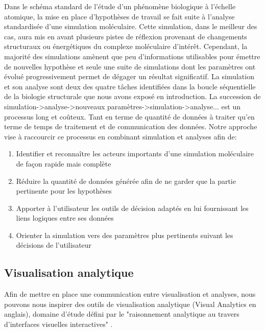 Dans le schéma standard de l'étude d'un phénomène biologique à l'échelle atomique, la mise en place d'hypothèses de travail se fait suite à l'analyse standardisée d'une simulation moléculaire. Cette simulation, dans le meilleur des cas, aura mis en avant plusieurs pistes de réflexion provenant de changements structuraux ou énergétiques du complexe moléculaire d'intérêt. Cependant, la majorité des simulations amènent que peu d'informations utilisables pour émettre de nouvelles hypothèse et seule une suite de simulations dont les paramètres ont évolué progressivement permet de dégager un résultat significatif. La simulation et son analyse sont deux des quatre tâches identifiées dans la boucle séquentielle de la biologie structurale que nous avons exposé en introduction. La succession de simulation->analyse->nouveaux paramètres->simulation->analyse... est un processus long et coûteux. Tant en terme de quantité de données à traiter qu'en terme de temps de traitement et de communication des données. Notre approche vise à raccourcir ce processus en combinant simulation et analyses afin de:
\begin{enumerate}
    \item Identifier et reconnaître les acteurs importants d'une simulation moléculaire de façon rapide mais complète
    \item Réduire la quantité de données générée afin de ne garder que la partie pertinente pour les hypothèses
    \item Apporter à l'utilisateur les outils de décision adaptés en lui fournissant les liens logiques entre ses données
    \item Orienter la simulation vers des paramètres plus pertinents suivant les décisions de l'utilisateur
\end{enumerate}

\subsection{Visualisation analytique}
Afin de mettre en place une communication entre visualisation et analyses, nous pouvons nous inspirer des outils de visualisation analytique (Visual Analytics en anglais), domaine d'étude défini par le "raisonnement analytique au travers d'interfaces visuelles interactives" \cite{cook_illuminating_2005}. 

